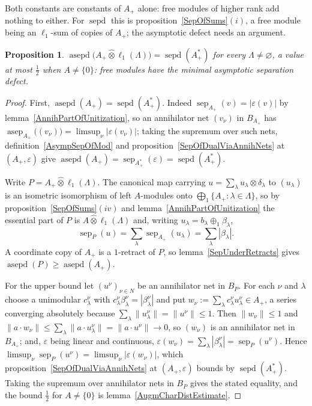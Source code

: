 \documentclass[11pt]{article}
\theoremstyle{plain}
\newtheorem{proposition}[theorem]{Proposition}
\theoremstyle{definition}
\newcommand{\projtens}{\mathbin{\widehat{\otimes}}}
\DeclareMathOperator{\sep}{sep}
\DeclareMathOperator{\sepd}{sepd}
\DeclareMathOperator{\asep}{asep}
\DeclareMathOperator{\asepd}{asepd}
\begin{document}
Both constants are constants of $A_+$ alone: free modules of higher rank add
nothing to either. For $\sepd$ this is proposition~\ref{SepOfSums}$(i)$, a free
module being an $\ell_1$-sum of copies of $A_+$; the asymptotic defect needs an
argument.

\begin{proposition}\label{AsympSepOfFreeMod}
$\asepd \bigl(A_+\projtens\ell_1(\Lambda) \bigr)=\sepd(A_+^*)$ for every
$\Lambda\neq\varnothing$, a value at most $\tfrac{1}{2}$ when $A\neq \{0 \}$:
free modules have the minimal asymptotic separation defect.
\end{proposition}

\begin{proof}
First, $\asepd(A_+)=\sepd(A_+^*)$. Indeed
$\sep_{A_+}(v)=|\varepsilon(v)|$ by lemma~\ref{AnnihPartOfUnitization}, so an
annihilator net ${(v_\nu)}$ in $B_{A_+}$ has
$\asep_{A_+} \bigl({(v_\nu)} \bigr)=\limsup_\nu|\varepsilon(v_\nu)|$; taking the
supremum over such nets, definition~\ref{AsympSepOfMod} and
proposition~\ref{SepOfDualViaAnnihNets} at $(A_+,\varepsilon)$ give
$\asepd(A_+)=\sep_{A_+^*}(\varepsilon)=\sepd(A_+^*)$.

Write $P=A_+\projtens\ell_1(\Lambda)$. The canonical map carrying
$u=\sum_\lambda u_\lambda\otimes\delta_\lambda$ to ${(u_\lambda)}$ is an
isometric isomorphism of left $A$-modules onto
$\bigoplus_1 \{A_+:\lambda\in\Lambda \}$, so by
proposition~\ref{SepOfSums}$(iv)$ and lemma~\ref{AnnihPartOfUnitization} the
essential part of $P$ is $A\projtens\ell_1(\Lambda)$ and, writing
$u_\lambda=b_\lambda\oplus_1\beta_\lambda$,
\[
\sep_P(u)=\sum_\lambda\sep_{A_+}(u_\lambda)=\sum_\lambda|\beta_\lambda| .
\]
A coordinate copy of $A_+$ is a $1$-retract of $P$, so
lemma~\ref{SepUnderRetracts} gives $\asepd(P)\geq\asepd(A_+)$.

For the upper bound let ${(u^\nu)}_{\nu\in N}$ be an annihilator net in $B_P$.
For each $\nu$ and $\lambda$ choose a unimodular $c^\nu_\lambda$ with
$c^\nu_\lambda\beta^\nu_\lambda=|\beta^\nu_\lambda|$ and put
$w_\nu:=\sum_\lambda c^\nu_\lambda u^\nu_\lambda\in A_+$, a series converging
absolutely because $\sum_\lambda\lVert u^\nu_\lambda\rVert=\lVert u^\nu\rVert
\leq 1$. Then $\lVert w_\nu\rVert\leq 1$ and
$\lVert a\cdot w_\nu\rVert\leq\sum_\lambda\lVert a\cdot u^\nu_\lambda\rVert
=\lVert a\cdot u^\nu\rVert\to 0$, so ${(w_\nu)}$ is an annihilator net in
$B_{A_+}$; and, $\varepsilon$ being linear and continuous,
$\varepsilon(w_\nu)=\sum_\lambda|\beta^\nu_\lambda|=\sep_P(u^\nu)$. Hence
$\limsup_\nu\sep_P(u^\nu)=\limsup_\nu|\varepsilon(w_\nu)|$, which
proposition~\ref{SepOfDualViaAnnihNets} at $(A_+,\varepsilon)$ bounds by
$\sepd(A_+^*)$. Taking the supremum over annihilator nets in $B_P$ gives the
stated equality, and the bound $\tfrac{1}{2}$ for $A\neq \{0 \}$ is
lemma~\ref{AugmCharDistEstimate}.
\end{proof}
\end{document}
